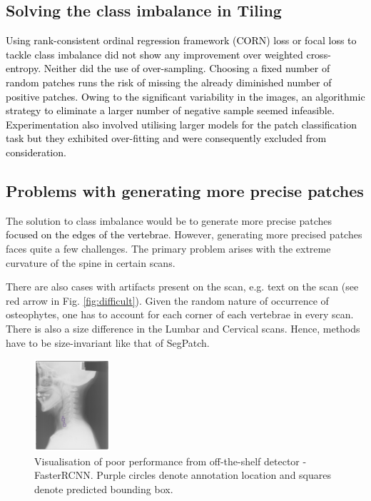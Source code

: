 \documentclass{article}
\newcommand{\final}[1]{\textcolor{black}{#1}}
\begin{document}
\subsection{Solving the class imbalance in Tiling}
\final{Using rank-consistent ordinal regression framework (CORN) loss \cite{Shi_2023} or focal loss \cite{lin2017focal} to tackle class imbalance did not show any improvement over weighted cross-entropy. Neither did the use of over-sampling. Choosing a fixed number of random patches runs the risk of missing the already diminished number of positive patches. Owing to the significant variability in the images, an algorithmic strategy to eliminate a larger number of negative sample seemed infeasible. Experimentation also involved utilising larger models for the patch classification task but they exhibited over-fitting and were consequently excluded from consideration.}

\subsection{Problems with generating more precise patches}
The solution to class imbalance would be to generate more precise patches \final{focused on the edges of the vertebrae}. However, generating more precised patches faces quite a few challenges. The primary problem arises with the extreme curvature of the spine in certain scans. 

There are also cases with artifacts present on the scan, e.g. text on the scan (see red arrow in Fig. \ref{fig:difficult}). Given the random nature of occurrence of osteophytes, one has to account for each corner of each vertebrae in every scan. 
There is also a size difference in the Lumbar and Cervical scans. Hence, methods have to be size-invariant like that of SegPatch.

\begin{figure}
    \centering
    \includegraphics[width=0.25\textwidth]{Det_Result.png}
    \caption{Visualisation of poor performance from off-the-shelf detector - FasterRCNN. Purple circles denote annotation location and squares denote predicted bounding box.}
    \label{fig:detection-results}
\end{figure} %
\end{document}
